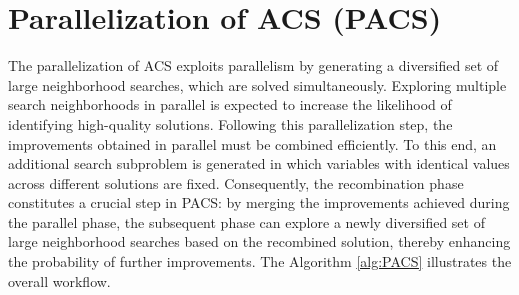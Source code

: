 \section{Parallelization of ACS (PACS)}
The parallelization of ACS exploits parallelism by generating a diversified set of large neighborhood searches, which are solved simultaneously. Exploring multiple search neighborhoods in parallel is expected to increase the likelihood of identifying high-quality solutions.
Following this parallelization step, the improvements obtained in parallel must be combined efficiently. To this end, an additional search subproblem is generated in which variables with identical values across different solutions are fixed. Consequently, the recombination phase constitutes a crucial step in PACS: by merging the improvements achieved during the parallel phase, the subsequent phase can explore a newly diversified set of large neighborhood searches based on the recombined solution, thereby enhancing the probability of further improvements.
The Algorithm \ref{alg:PACS} illustrates the overall workflow.
